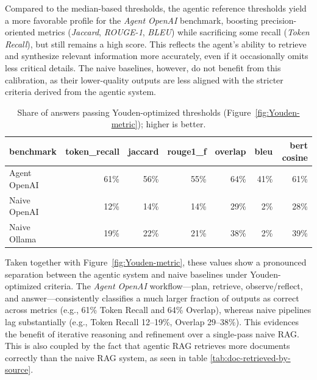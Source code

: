 Compared to the median-based thresholds, the agentic reference thresholds yield a more favorable profile for the \textit{Agent OpenAI} benchmark, boosting precision-oriented metrics (\textit{Jaccard}, \textit{ROUGE-1}, \textit{BLEU}) while sacrificing some recall (\textit{Token Recall}), but still remains a high score. This reflects the agent's ability to retrieve and synthesize relevant information more accurately, even if it occasionally omits less critical details. The naive baselines, however, do not benefit from this calibration, as their lower-quality outputs are less aligned with the stricter criteria derived from the agentic system.

\begin{table}[htbp]
    \centering
    \begin{tabular}{l r r r r r r}
        \hline
        benchmark & token\_recall & jaccard & rouge1\_f & overlap & bleu & bert cosine \\
        \hline
        Agent OpenAI & 61\% & 56\% & 55\% & 64\% & 41\% & 61\% \\
        Naive OpenAI & 12\% & 14\% & 14\% & 29\% & 2\% & 28\% \\
        Naive Ollama & 19\% & 22\% & 21\% & 38\% & 2\% & 39\% \\
        \hline
    \end{tabular}
    \caption{Share of answers passing Youden-optimized thresholds (Figure~\ref{fig:Youden-metric}); higher is better.}
    \label{tab:youden-metric-values}
\end{table}

Taken together with Figure~\ref{fig:Youden-metric}, these values show a pronounced separation between the agentic system and naive baselines under Youden-optimized criteria. The \textit{Agent OpenAI} workflow—plan, retrieve, observe/reflect, and answer—consistently classifies a much larger fraction of outputs as correct across metrics (e.g., 61\% Token Recall and 64\% Overlap), whereas naive pipelines lag substantially (e.g., Token Recall 12–19\%, Overlap 29–38\%). This evidences the benefit of iterative reasoning and refinement over a single-pass naive RAG. This is also coupled by the fact that agentic RAG retrieves more documents correctly than the naive RAG system, as seen in table \ref{tab:doc-retrieved-by-source}.





